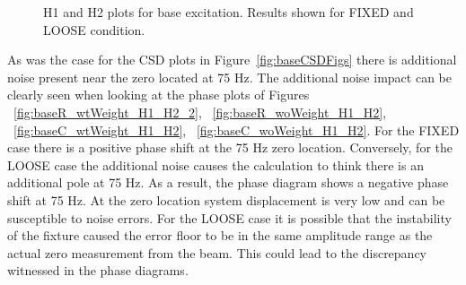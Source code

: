 \documentclass[paper=a4, fontsize=12pt]{scrartcl} %
\begin{document}
%
	\begin{figure}[H]
		\centering
		\quad
		\quad
		\quad
		\caption{H1 and H2 plots for base excitation. Results shown for FIXED and LOOSE 					condition.}
		\label{fig:baseH1H2Figs}
	\end{figure}
%
As was the case for the CSD plots in Figure~\ref{fig:baseCSDFigs} there is additional noise present near the zero located at 75 Hz. The additional noise impact can be clearly seen when looking at the phase plots of Figures ~\ref{fig:baseR_wtWeight_H1_H2_2}, ~\ref{fig:baseR_woWeight_H1_H2}, ~\ref{fig:baseC_wtWeight_H1_H2},  ~\ref{fig:baseC_woWeight_H1_H2}. For the FIXED case there is a positive phase shift at the 75 Hz zero location. Conversely, for the LOOSE case the additional noise causes the calculation to think there is an additional pole at 75 Hz. As a result, the phase diagram shows a negative phase shift at 75 Hz. At the zero location system displacement is very low and can be susceptible to noise errors. For the LOOSE case it is possible that the instability of the fixture caused the error floor to be in the same amplitude range as the actual zero measurement from the beam. This could lead to the discrepancy witnessed in the phase diagrams.
\end{document}
